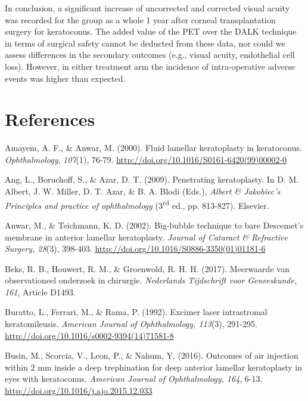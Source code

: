 \documentclass[authordate, empirical]{jote-new-article}
\begin{document}
	In conclusion, a significant increase of uncorrected and corrected visual acuity was recorded for the group as a whole 1 year after corneal transplantation surgery for keratoconus. The added value of the PET over the DALK technique in terms of surgical safety cannot be deducted from these data, nor could we assess differences in the secondary outcomes (e.g., visual acuity, endothelial cell loss). However, in either treatment arm the incidence of intra-operative adverse events was higher than expected.







	\section{References }



	Amayem, A. F., \& Anwar, M. (2000). Fluid lamellar keratoplasty in keratoconus. \emph{Ophthalmology}, \emph{107}(1), 76-79. \url{http://doi.org/10.1016/S0161-6420(99)00002-0}



	Ang, L., Boruchoff, S., \& Azar, D. T. (2009). Penetrating keratoplasty. In D. M. Albert, J. W. Miller, D. T. Azar, \& B. A. Blodi (Eds.), \emph{Albert \& Jakobiec's} \emph{Principles and practice of ophthalmology }(3\textsuperscript{rd} ed., pp. 813-827). Elsevier.



	Anwar, M., \& Teichmann, K. D. (2002). Big-bubble technique to bare Descemet's membrane in anterior lamellar keratoplasty. \emph{Journal of Cataract \& Refractive Surgery, 28}(3), 398-403. \url{http://doi.org/10.1016/S0886-3350(01)01181-6}



	Beks, R. B., Houwert, R. M., \& Groenwold, R. H. H. (2017). Meerwaarde van observationeel onderzoek in chirurgie. \emph{Nederlands Tijdschrift voor Geneeskunde, 161}, Article D1493.



	Buratto, L., Ferrari, M., \& Rama, P. (1992). Excimer laser intrastromal keratomileusis. \emph{American Journal of Ophthalmology, 113}(3), 291-295. \url{http://doi.org/10.1016/s0002-9394(14)71581-8}



	Busin, M., Scorcia, V., Leon, P., \& Nahum, Y. (2016). Outcomes of air injection within 2 mm inside a deep trephination for deep anterior lamellar keratoplasty in eyes with keratoconus. \emph{American Journal of Ophthalmology, 164}, 6-13. \url{http://doi.org/10.1016/j.ajo.2015.12.033}
\end{document}
